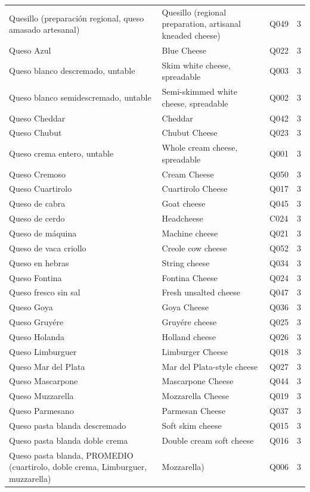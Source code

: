 {\begin{longtable}{p{4.3cm}p{5.5cm}p{1.5cm}p{0.7cm}}
Quesillo (preparación regional, queso amasado artesanal) & Quesillo (regional preparation, artisanal kneaded cheese) & Q049 & 3\\
Queso Azul & Blue Cheese & Q022 & 3\\
Queso blanco descremado, untable & Skim white cheese, spreadable & Q003 & 3\\
Queso blanco semidescremado, untable & Semi-skimmed white cheese, spreadable & Q002 & 3\\
Queso Cheddar & Cheddar & Q042 & 3\\
Queso Chubut & Chubut Cheese & Q023 & 3\\
Queso crema entero, untable & Whole cream cheese, spreadable & Q001 & 3\\
Queso Cremoso & Cream Cheese & Q050 & 3\\
Queso Cuartirolo & Cuartirolo Cheese & Q017 & 3\\
Queso de cabra & Goat cheese & Q045 & 3\\
Queso de cerdo & Headcheese & C024 & 3\\
Queso de máquina & Machine cheese & Q021 & 3\\
Queso de vaca criollo & Creole cow cheese & Q052 & 3\\
Queso en hebras & String cheese & Q034 & 3\\
Queso Fontina & Fontina Cheese & Q024 & 3\\
Queso fresco sin sal & Fresh unsalted cheese & Q047 & 3\\
Queso Goya & Goya Cheese & Q036 & 3\\
Queso Gruyére & Gruyére cheese & Q025 & 3\\
Queso Holanda & Holland cheese & Q026 & 3\\
Queso Limburguer & Limburger Cheese & Q018 & 3\\
Queso Mar del Plata & Mar del Plata-style cheese & Q027 & 3\\
Queso Mascarpone & Mascarpone Cheese & Q044 & 3\\
Queso Muzzarella & Mozzarella Cheese & Q019 & 3\\
Queso Parmesano & Parmesan Cheese & Q037 & 3\\
Queso pasta blanda descremado & Soft skim cheese & Q015 & 3\\
Queso pasta blanda doble crema & Double cream soft cheese & Q016 & 3\\
Queso pasta blanda, PROMEDIO (cuartirolo, doble crema, Limburguer, muzzarella) & Mozzarella) & Q006 & 3\\

\end{longtable}}
